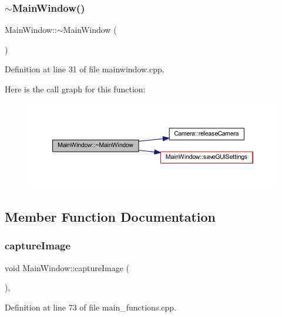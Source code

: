 \subsubsection{\texorpdfstring{$\sim$MainWindow()}{~MainWindow()}}
{\footnotesize\ttfamily Main\+Window\+::$\sim$\+Main\+Window (\begin{DoxyParamCaption}{ }\end{DoxyParamCaption})}



Definition at line 31 of file mainwindow.\+cpp.

Here is the call graph for this function\+:
\nopagebreak
\begin{figure}[H]
\begin{center}
\leavevmode
\includegraphics[width=350pt]{classMainWindow_ae98d00a93bc118200eeef9f9bba1dba7_cgraph}
\end{center}
\end{figure}


\subsection{Member Function Documentation}
\mbox{\label{classMainWindow_a22df50c440a9aa974654f787d5935761}} 
\subsubsection{\texorpdfstring{captureImage}{captureImage}}
{\footnotesize\ttfamily void Main\+Window\+::capture\+Image (\begin{DoxyParamCaption}{ }\end{DoxyParamCaption})\hspace{0.3cm}{\ttfamily [private]}, {\ttfamily [slot]}}



Definition at line 73 of file main\+\_\+functions.\+cpp.

